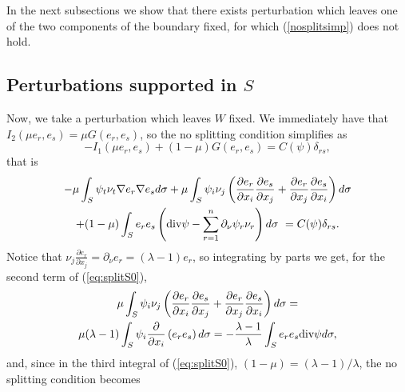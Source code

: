 \documentclass[a4paper,reqno,11pt,oneside]{amsart}
\theoremstyle{plain}
\theoremstyle{plain}
\theoremstyle{plain}
\theoremstyle{remark}
\def\div{\textup{div}}
\begin{document}
In the next subsections we show that there exists perturbation which leaves one of the two components of the boundary fixed, for which (\ref{nosplitsimp}) does not hold. 



\subsection{Perturbations supported in  $S$}\label{sec:Sneumann}

Now, we take a perturbation which leaves $W$ fixed. We immediately have that $I_2( \mu e_r, e_s)=\mu G( e_r, e_s)$, so the no splitting condition simplifies as
\begin{equation}
    -I_1(  \mu e_r,e_s)+(1-\mu) G( e_r, e_s)
=C(\psi)\delta_{rs}, 
\end{equation}
that is
  \begin{multline}\label{eq:splitS0}
    - \mu\int_{S}\psi_t\nu_t\nabla e_r\nabla e_s d\sigma
    + \mu \int_{S}
\psi_i\nu_j \left(\frac{\partial e_r}{\partial x_i}\frac{\partial e_s}{\partial x_j}+\frac{\partial e_r}{\partial x_j}\frac{\partial e_s}{\partial x_i}
\right) d\sigma\\
+(1-\mu)  \int_{S}e_r e_s \left(\div \psi -\sum_{r=1}^n \partial_\nu \psi_r \nu_r\right)d\sigma \ =
C(\psi)\delta_{rs}.
 \end{multline}
Notice that  $\nu_j\frac{\partial e_r}{\partial x_j}=\partial_\nu e_r=(\lambda-1) e_r$, so integrating by parts we get, for the second term of (\ref{eq:splitS0}), 
\begin{multline}
    \mu \int_{S}
\psi_i\nu_j \left(\frac{\partial e_r}{\partial x_i}\frac{\partial e_s}{\partial x_j}+\frac{\partial e_r}{\partial x_j}\frac{\partial e_s}{\partial x_i}
\right) d\sigma=\\
\mu(\lambda-1) \int_{S}
\psi_i\frac{\partial }{\partial x_i}\left(e_r e_s
\right) d\sigma=-\frac{\lambda-1}\lambda 
\int_{S}
e_r e_s\div\psi
 d\sigma,
\end{multline}
and, since in the third integral of (\ref{eq:splitS0}), $(1-\mu)=(\lambda-1)/\lambda$, the no splitting condition becomes
\end{document}

